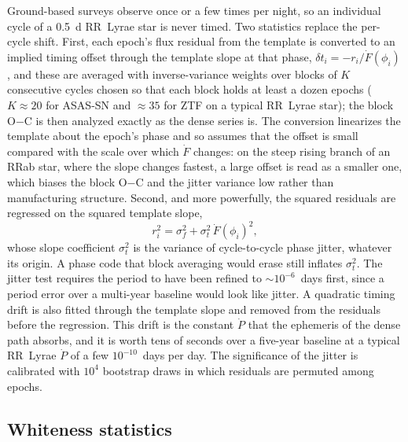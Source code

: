 \documentclass[final,5p]{elsarticle}
\newcommand{\oc}{O$-$C}
\begin{document}
Ground-based surveys observe once or a few times per night, so an individual cycle of a 0.5~d RR~Lyrae star is never timed. Two statistics replace the per-cycle shift. First, each epoch's flux residual from the template is converted to an implied timing offset through the template slope at that phase, $\delta t_i = -r_i/\dot F(\phi_i)$, and these are averaged with inverse-variance weights over blocks of $K$ consecutive cycles chosen so that each block holds at least a dozen epochs ($K\approx20$ for ASAS-SN and $\approx35$ for ZTF on a typical RR~Lyrae star); the block \oc{} is then analyzed exactly as the dense series is. The conversion linearizes the template about the epoch's phase and so assumes that the offset is small compared with the scale over which $\dot F$ changes: on the steep rising branch of an RRab star, where the slope changes fastest, a large offset is read as a smaller one, which biases the block \oc{} and the jitter variance low rather than manufacturing structure. Second, and more powerfully, the squared residuals are regressed on the squared template slope,
\begin{equation}
  r_i^2 = \sigma_f^2 + \sigma_t^2\,\dot F(\phi_i)^2 ,
  \label{eq:jitter}
\end{equation}
whose slope coefficient $\sigma_t^2$ is the variance of cycle-to-cycle phase jitter, whatever its origin. A phase code that block averaging would erase still inflates $\sigma_t^2$. The jitter test requires the period to have been refined to $\sim10^{-6}$~days first, since a period error over a multi-year baseline would look like jitter. A quadratic timing drift is also fitted through the template slope and removed from the residuals before the regression. This drift is the constant $\dot P$ that the ephemeris of the dense path absorbs, and it is worth tens of seconds over a five-year baseline at a typical RR~Lyrae $\dot P$ of a few $10^{-10}$~days per day. The significance of the jitter is calibrated with $10^4$ bootstrap draws in which residuals are permuted among epochs.

\subsection{Whiteness statistics}
\label{sec:whiteness}
\end{document}
